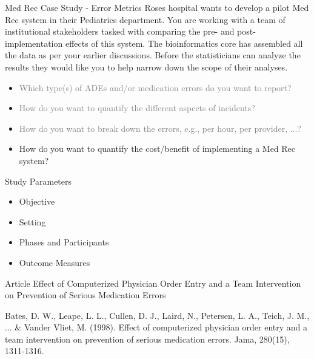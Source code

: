 \documentclass[10pt]{beamer}
\begin{document}
\begin{frame}{Med Rec Case Study - Error Metrics}
	Roses hospital wants to develop a pilot Med Rec system in their Pediatrics department.  You are working with a team of institutional stakeholders tasked with comparing the pre- and post-implementation effects of this system.  The bioinformatics core has assembled all the data as per your earlier discussions.  Before the statisticians can analyze the results they would like you to help narrow down the scope of their analyses.
	\begin{itemize}
		\item \textcolor<2->{gray}{Which type(s) of ADEs and/or medication errors do you want to report?}
		\item \textcolor<2->{gray}{How do you want to quantify the different aspects of incidents?}
		\item \textcolor<2->{gray}{How do you want to break down the errors, e.g., per hour, per provider, ...?}
		\item<2-> How do you want to quantify the cost/benefit of implementing a Med Rec system?
	\end{itemize}	 
\end{frame}


\begin{frame}{Study Parameters}
	\begin{itemize}
		\item Objective
		\item Setting
		\item Phases and Participants
		\item Outcome Measures
	\end{itemize}
\end{frame}


\begin{frame}{Article}
	\Large{Effect of Computerized Physician Order Entry and a Team Intervention on Prevention of Serious Medication Errors}
	
	
	\scriptsize{Bates, D. W., Leape, L. L., Cullen, D. J., Laird, N., Petersen, L. A., Teich, J. M., ... \& Vander Vliet, M. (1998). Effect of computerized physician order entry and a team intervention on prevention of serious medication errors. Jama, 280(15), 1311-1316.}
\end{frame}
\end{document}
